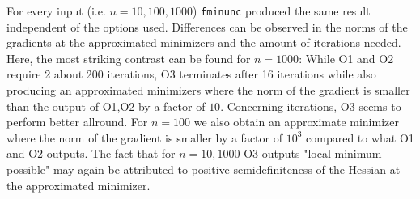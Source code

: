 \documentclass{article}
\begin{document}
    For every input (i.e. $n=10,100,1000$) \texttt{fminunc} produced the same result independent of the options used. Differences can be observed in the norms of the gradients at the approximated minimizers and the amount of iterations needed. Here, the most striking contrast can be found for $n=1000$: While O1 and O2 require 2 about 200 iterations, O3 terminates after 16 iterations while also producing an approximated minimizers where the norm of the gradient is smaller than the output of O1,O2 by a factor of $10$. Concerning iterations, O3 seems to perform better allround. For $n=100$ we also obtain an approximate minimizer where the norm of the gradient is smaller by a factor of $10^3$ compared to what O1 and O2 outputs. The fact that for $n=10,1000$ O3 outputs "local minimum possible" may again be attributed to positive semidefiniteness of the Hessian at the approximated minimizer. 
    
\end{document}

